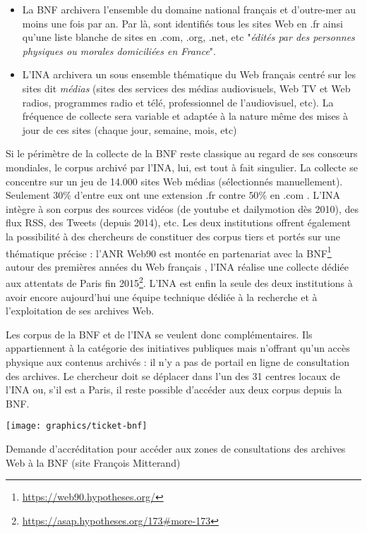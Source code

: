 \documentclass[symmetric,justified,marginals=raggedouter]{tufte-book}
\begin{document}
\begin{itemize}[leftmargin=*]  
\item La BNF archivera l'ensemble du domaine national français et d'outre-mer au moins une fois par an. Par là, sont identifiés tous les sites Web en .fr ainsi qu'une liste blanche de sites en .com, .org, .net, etc "\textit{édités par des personnes physiques ou morales domiciliées en France}".
\item L'INA archivera un sous ensemble thématique du Web français centré sur les sites dit \textit{médias} (sites des services des médias audiovisuels, Web TV et Web radios, programmes radio et télé, professionnel de l'audiovisuel, etc). La fréquence de collecte sera variable et adaptée à la nature même des mises à jour de ces sites (chaque jour, semaine, mois, etc)
\end{itemize}

\noindent Si le périmètre de la collecte de la BNF reste classique au regard de ses consœurs mondiales, le corpus archivé par l'INA, lui, est tout à fait singulier. La collecte se concentre sur un jeu de 14.000 sites Web médias (sélectionnés manuellement). Seulement $30\%$ d'entre eux ont une extension .fr contre $50\%$ en .com \citep{drugeon_technical_2005}. L'INA intègre à son corpus des sources vidéos (de youtube et dailymotion dès 2010), des flux RSS, des Tweets (depuis 2014), etc. Les deux institutions offrent également la possibilité à des chercheurs de constituer des corpus tiers et portés sur une thématique précise : l'ANR Web90 est montée en partenariat avec la BNF\footnote{\url{https://web90.hypotheses.org/}} autour des premières années du Web français \citep{schafer_web_2016}, l'INA réalise une collecte dédiée aux attentats de Paris fin 2015\footnote{\url{https://asap.hypotheses.org/173\#more-173}}. L'INA est enfin la seule des deux institutions à avoir encore aujourd'hui une équipe technique dédiée à la recherche et à l'exploitation de ses archives Web.

Les corpus de la BNF et de l'INA se veulent donc complémentaires. Ils appartiennent à la catégorie des initiatives publiques mais n'offrant qu'un accès physique aux contenus archivés : il n'y a pas de portail en ligne de consultation des archives. Le chercheur doit se déplacer dans l'un des 31 centres locaux de l'INA ou, s'il est a Paris, il reste possible d'accéder aux deux corpus depuis la BNF.

\begin{marginfigure}%
  \texttt{[image: graphics/ticket-bnf]}
  \vspace*{0.2cm}  
  \caption{Demande d'accréditation pour accéder aux zones de consultations des archives Web à la BNF (site François Mitterand)}
  \label{fig:ticket-bnf}
\end{marginfigure} 
\end{document}
